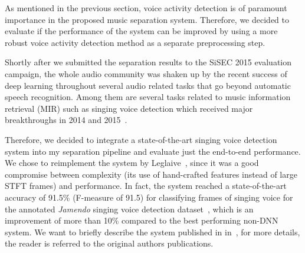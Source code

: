 As mentioned in the previous section, voice activity detection is of paramount importance in the proposed music separation system.
Therefore, we decided to evaluate if the performance of the system can be improved by using a more robust voice activity detection method as a separate preprocessing step.
\par
Shortly after we submitted the separation results to the SiSEC 2015 evaluation campaign, the whole audio community was shaken up by the recent success of deep learning throughout several audio related tasks that go beyond automatic speech recognition.
Among them are several tasks related to music information retrieval (MIR) such as singing voice detection which received major breakthroughs in 2014 and 2015~\cite{lehner14, lehner15, Leglaive15, schlueter15}.
\par
Therefore, we decided to integrate a state-of-the-art singing voice detection system into my separation pipeline and evaluate just the end-to-end performance.
We chose to reimplement the system by Leglaive~\cite{Leglaive15}, since it was a good compromise between complexity (its use of hand-crafted features instead of large STFT frames) and performance.
In fact, the system reached a state-of-the-art accuracy of 91.5\% (F-measure of 91.5) for classifying frames of singing voice for the annotated \emph{Jamendo} singing voice detection dataset~\cite{ramona08}, which is an improvement of more than 10\% compared to the best performing non-DNN system.
We want to briefly describe the system published in in~\cite{Leglaive15}, for more details, the reader is referred to the original authors publications.
